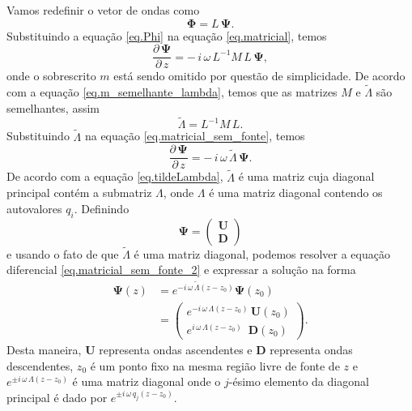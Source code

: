 Vamos redefinir o vetor de ondas como
\begin{equation}\label{eq.Phi}
\mathbf{\Phi}=L\,\mathbf{\Psi}.
\end{equation}
Substituindo a equa\c{c}\~ao \ref{eq.Phi} na equa\c{c}\~ao \ref{eq.matricial}, temos
\begin{equation}\label{eq.matricial_sem_fonte}
\frac{\partial\,\mathbf{\Psi}}{\partial\,z} =-\,i\,\omega\,L^{-1}M\,L\,\mathbf{\Psi},
\end{equation}
onde o sobrescrito $m$ est\'a sendo omitido por quest\~ao de simplicidade.
De acordo com a equa\c{c}\~ao \ref{eq.m_semelhante_lambda}, temos que as matrizes $M$ e $\tilde{\Lambda}$ s\~ao semelhantes, assim
\begin{equation*}
\tilde{\Lambda}=L^{-1}M\,L.
\end{equation*}
Substituindo $\tilde{\Lambda}$ na equa\c{c}\~ao \ref{eq.matricial_sem_fonte}, temos
\begin{equation}\label{eq.matricial_sem_fonte_2}
\frac{\partial\,\mathbf{\Psi}}{\partial\,z} =-\,i\,\omega\,\tilde{\Lambda}\,\mathbf{\Psi}.
\end{equation}
De acordo com a equa\c{c}\~ao \ref{eq.tildeLambda}, $\tilde{\Lambda}$ \'e uma matriz cuja diagonal principal cont\'em a submatriz $\Lambda$, onde $\Lambda$ \'e uma matriz diagonal contendo os autovalores $q_i$.
Definindo
\begin{equation}\label{eq.definicao_psi}
\mathbf{\Psi}=
\begin{pmatrix}
\mathbf{U}\\
\mathbf{D}
\end{pmatrix}
\end{equation}
e usando o fato de que $\tilde{\Lambda}$ \'e uma matriz diagonal, podemos resolver a equa\c{c}\~ao diferencial \ref{eq.matricial_sem_fonte_2} e expressar a solu\c{c}\~ao na forma
\begin{align}\nonumber
\mathbf{\Psi}(z)&=e^{-i\,\omega\,\tilde{\Lambda}(z-z_0)}\mathbf{\Psi}(z_0)\\\label{eq.solucao_psi}
&=\begin{pmatrix}
e^{-i\,\omega\,\Lambda(z-z_0)}\,\mathbf{U}(z_0)\\
e^{i\,\omega\,\Lambda(z-z_0)}\,\,\,\mathbf{D}(z_0)
\end{pmatrix}.
\end{align}
Desta maneira, $\mathbf{U}$ representa ondas ascendentes e $\mathbf{D}$ representa ondas descendentes, $z_0$ \'e um ponto fixo na mesma regi\~ao livre de fonte de $z$ e $e^{\pm i\,\omega\,\Lambda(z-z_0)}$ \'e uma matriz diagonal onde o $j$-ésimo elemento da diagonal principal \'e dado por $e^{\pm i\,\omega\,q_j(z-z_0)}$. 


